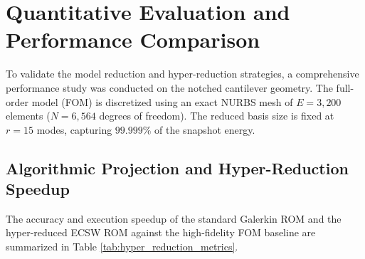\section{Quantitative Evaluation and Performance Comparison} \label{sec:benchmarks}
To validate the model reduction and hyper-reduction strategies, a comprehensive performance study was conducted on the notched cantilever geometry. The full-order model (FOM) is discretized using an exact NURBS mesh of $E = 3,200$ elements ($N = 6,564$ degrees of freedom). The reduced basis size is fixed at $r = 15$ modes, capturing $99.999\%$ of the snapshot energy. 

\subsection{Algorithmic Projection and Hyper-Reduction Speedup}
The accuracy and execution speedup of the standard Galerkin ROM and the hyper-reduced ECSW ROM against the high-fidelity FOM baseline are summarized in Table \ref{tab:hyper_reduction_metrics}.

\begin{table}[htbp]
        \centering
        \caption{Quantitative comparative performance of model reduction strategies against the Full Order Model (FOM) baseline.}
        \label{tab:hyper_reduction_metrics}
\end{table}

